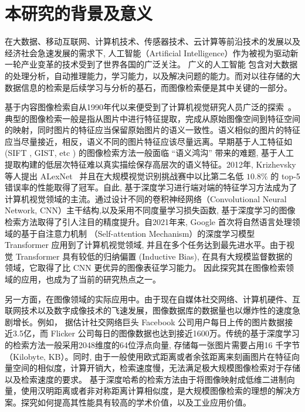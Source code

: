 \section{本研究的背景及意义}
在大数据、移动互联网、计算机技术、传感器技术、云计算等前沿技术的发展以及经济社会急速发展的需求下, 人工智能（Artificial Intelligence）作为被视为驱动新一轮产业变革的技术受到了世界各国的广泛关注。 广义的人工智能\cite{russell2010artificial} 包含对大数据的处理分析，自动推理能力，学习能力，以及解决问题的能力。而对以往存储的大数据信息的检索是后续学习与分析的基石，而图像检索便是其中关键的一部分。 \par
基于内容图像检索自从1990年代以来便受到了计算机视觉研究人员广泛的探索~\cite{zhou2017recent}。典型的图像检索一般是指从图片中进行特征提取，完成从原始图像空间到特征空间的映射，同时图片的特征应当保留原始图片的语义一致性。语义相似的图片的特征应当尽量接近，相反，语义不同的图片特征应该尽量远离。早期基于人工特征如 (SIFT , GIST, etc ) 的图像检索方法一般面临 ``语义鸿沟'' \cite{li2016socializing} 带来的难题, 基于人工提取构建的低层次特征难以真实描绘保存高层次的语义特征。2012年, Krizhevsky 等人提出 ALexNet~\cite{krizhevsky2017imagenet} 并且在大规模视觉识别挑战赛中以比第二名低 $10.8\%$ 的 top-5 错误率的性能取得了冠军。自此, 基于深度学习进行端对端的特征学习方法成为了计算机视觉领域的主流。通过设计不同的卷积神经网络（Convolutional Neural Network, CNN）主干结构,以及采用不同度量学习损失函数, 基于深度学习的图像检索方法取得了引人注目的精度提升。自2021年来, Google 首次将自然语言处理领域的基于自注意力机制 （Self-attention Mechanism）的深度学习模型 Transformer 应用到了计算机视觉领域, 并且在多个任务达到最先进水平。由于视觉 Transformer 具有较低的归纳偏置 (Inductive Bias), 在具有大规模监督数据的领域，它取得了比 CNN 更优异的图像表征学习能力。 因此探究其在图像检索领域的应用，也成为了当前的研究热点之一。  \par
另一方面，在图像领域的实际应用中。由于现在自媒体社交网络、计算机硬件、互联网技术以及数字成像技术的飞速发展，图像数据库的数据量也以爆炸性的速度急剧增长。例如， 据估计社交网络巨头 Facebook 公司用户每日上传的图片数据接近3.5亿，而 Flicker 公司每日的图像数据也达到接近1600万。传统的基于深度学习的检索方法一般采用2048维度的64位浮点向量, 存储每一张图片需要占用16 千字节 （Kilobyte, KB）。同时, 由于一般使用欧式距离或者余弦距离来刻画图片在特征向量空间的相似度，计算开销大，检索速度慢，无法满足极大规模图像检索对于存储以及检索速度的要求。 基于深度哈希的检索方法由于将图像映射成低维二进制向量，使用汉明距离或者非对称距离计算相似度，是大规模图像检索的理想的解决方案。探究如何提高其性能具有较高的学术价值，以及工业应用价值。\par
